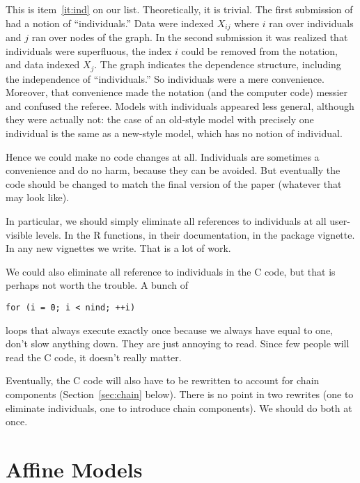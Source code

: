 \documentclass[11pt]{article}
\begin{document}
This is item~\ref{it:ind} on our list.  Theoretically, it is trivial.
The first submission of \citet{gws} had a notion of ``individuals.''
Data were indexed $X_{i j}$ where $i$ ran over individuals and $j$ ran
over nodes of the graph.  In the second submission it was realized that
individuals were superfluous, the index $i$ could be removed from the notation,
and data indexed $X_j$.  The graph indicates the dependence structure,
including the independence of ``individuals.''  So individuals were a mere
convenience.  Moreover, that convenience made the notation (and the computer
code) messier and confused the referee.  Models with
individuals appeared less general, although they were actually not:
the case of an old-style model with precisely one individual is the same
as a new-style model, which has no notion of individual.

Hence we could make no code changes at all.  Individuals are sometimes
a convenience and do no harm, because they can be avoided.  But eventually
the code should be changed to match the final version of the paper (whatever
that may look like).

In particular, we should simply eliminate all references to individuals
at all user-visible levels.  In the R functions, in their documentation,
in the package vignette.  In any new vignettes we write.  That is a lot
of work.

We could also eliminate all reference to individuals in the C code,
but that is perhaps not worth the trouble.  A bunch of
\begin{verbatim}
for (i = 0; i < nind; ++i)
\end{verbatim}
loops that always execute exactly once because we always have \verb@nind@
equal to one, don't slow anything down.  They are just annoying to read.
Since few people will read the C code, it doesn't really matter.

Eventually, the C code will also have to be rewritten to account for
chain components (Section~\ref{sec:chain} below).  There is no point in
two rewrites (one to eliminate individuals, one to introduce chain components).
We should do both at once.

\section{Affine Models} \label{sec:affine}
\end{document}
